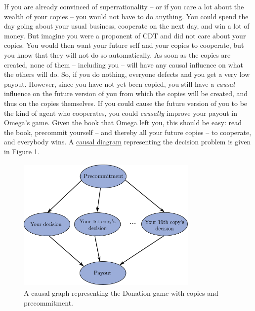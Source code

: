 If you are already convinced of superrationality -- or if you care a lot
about the wealth of your copies -- you would not have to do anything.
You could spend the day going about your usual business, cooperate on
the next day, and win a lot of money. But imagine you were a proponent
of CDT and did not care about your copies. You would then want your
future self and your copies to cooperate, but you know that they will
not do so automatically. As soon as the copies are created, none of them
-- including you -- will have any causal influence on what the others
will do. So, if you do nothing, everyone defects and you get a very low
payout. However, since you have not yet been copied, you still have a
\emph{causal} influence on the future version of you from which the
copies will be created, and thus on the copies themselves. If you could
cause the future version of you to be the kind of agent who cooperates,
you could \emph{causally} improve your payout in Omega's game. Given the
book that Omega left you, this should be easy: read the book, precommit
yourself -- and thereby all your future copies -- to cooperate, and
everybody wins. A
\href{https://en.wikipedia.org/wiki/Causal_model\#Causal_diagram}{causal
diagram} representing the decision problem is given in Figure
\ref{precommitment-causal-graph}.

\begin{figure}
    \centering
    \includegraphics[width=3.46217in,height=2.59375in]{figs/precommitment-causal-graph}
    \caption{A causal graph representing the Donation game with copies and precommitment.}
    \label{precommitment-causal-graph}
\end{figure}



